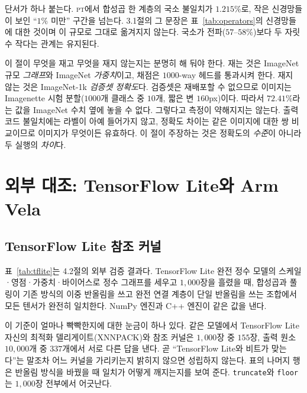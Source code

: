\documentclass[11pt,a4paper,oneside]{report}
\newcommand{\fittable}[1]{\adjustbox{max width=\textwidth}{#1}}
\begin{document}
단서가 하나 붙는다. \textsc{pt}에서 합성곱 한 계층의 국소 불일치가 $1.215\%$로, 작은 신경망들이 보인
``$1\%$ 미만'' 구간을 넘는다. 3.1절의 그 문장은 표~\ref{tab:operators}의 신경망들에 대한 것이며 이 규모로
그대로 옮겨지지 않는다. 국소가 전파($57$--$58\%$)보다 두 자릿수 작다는 관계는 유지된다.

이 절이 무엇을 재고 무엇을 재지 않는지는 분명히 해 둬야 한다. 재는 것은 ImageNet 규모 \emph{그래프}와
ImageNet \emph{가중치}이고, 채점은 $1000$-way 헤드를 통과시켜 한다. 재지 않는 것은 ImageNet-1k
\emph{검증셋 정확도}다. 검증셋은 재배포할 수 없으므로 이미지는 Imagenette 시험 분할($1000$개 클래스 중
$10$개, 짧은 변 $160$px)이다. 따라서 $72.41\%$라는 값을 ImageNet 수치 옆에 놓을 수 없다. 그렇다고 측정이
약해지지는 않는다. 출력 코드 불일치에는 라벨이 아예 들어가지 않고, 정확도 차이는 같은 이미지에 대한 쌍
비교이므로 이미지가 무엇이든 유효하다. 이 절이 주장하는 것은 정확도의 \emph{수준}이 아니라 두 실행의
\emph{차이}다.

\section{외부 대조: TensorFlow Lite와 Arm Vela}

\subsection*{TensorFlow Lite 참조 커널}

표~\ref{tab:tflite}는 4.2절의 외부 검증 결과다. TensorFlow Lite 완전 정수 모델의 스케일·영점·가중치·바이어스로
정수 그래프를 세우고 $1{,}000$장을 흘렸을 때, 합성곱과 풀링이 기존 방식의 이중 반올림을 쓰고 완전 연결
계층이 단일 반올림을 쓰는 조합에서 모든 텐서가 완전히 일치한다. NumPy 엔진과 C++ 엔진이 같은 값을 낸다.

\begin{table}[!t]
\caption[TensorFlow Lite 참조 커널 교차 검증]{TensorFlow Lite 참조 커널과의 교차 검증. 이미지 $1{,}000$장, 출력 원소 $10{,}000$개.
\texttt{tflite+fc-single}은 합성곱·풀링이 이중 반올림, 완전 연결 계층이 단일 반올림을 쓰는 조합이다.}
\label{tab:tflite}
\centering
\small
\fittable{}
\end{table}

이 기준이 얼마나 빡빡한지에 대한 눈금이 하나 있다. 같은 모델에서 TensorFlow Lite 자신의 최적화
델리게이트(XNNPACK)와 참조 커널은 $1{,}000$장 중 $155$장, 출력 원소 $10{,}000$개 중 $337$개에서 서로 다른
답을 낸다. 곧 ``TensorFlow Lite와 비트가 맞는다''는 말조차 어느 커널을 가리키는지 밝히지 않으면 성립하지
않는다. 표의 나머지 행은 반올림 방식을 바꿨을 때 일치가 어떻게 깨지는지를 보여 준다. \texttt{truncate}와
\texttt{floor}는 $1{,}000$장 전부에서 어긋난다.
\end{document}
